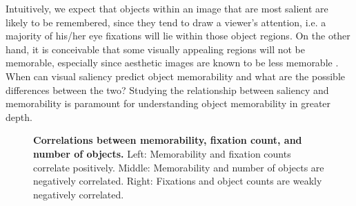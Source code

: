 Intuitively, we expect that objects within an image that are most salient are likely to be remembered, since they tend to draw a viewer's attention, i.e. a majority of his/her eye fixations will lie within those object regions. On the other hand, it is conceivable that some visually appealing regions will not be memorable, especially since aesthetic images are known to be less memorable \cite{isola11,isola14}. When can visual saliency predict object memorability and what are the possible differences between the two? Studying the relationship between saliency and memorability is paramount for understanding object memorability in greater depth.

\begin{figure}[t]
\centering
{}
\vspace{-5mm}\caption{\footnotesize\textbf{Correlations between memorability, fixation count, and number of objects.} Left: Memorability and fixation counts correlate positively. Middle:  Memorability and number of objects are negatively correlated. Right: Fixations and object counts are weakly negatively correlated.}\label{fig:scatterFixation}%
\end{figure}

